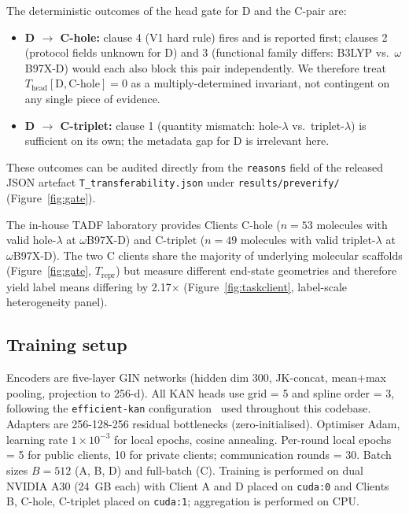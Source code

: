 \documentclass[11pt,a4paper]{article}
\begin{document}
\begin{sloppypar}
\noindent The deterministic outcomes of the head gate for D and the C-pair are:
\begin{itemize}
  \item \textbf{D $\to$ C-hole:} clause 4 (V1 hard rule) fires and is reported first; clauses 2 (protocol fields unknown for D) and 3 (functional family differs: B3LYP vs.\ $\omega$B97X-D) would each also block this pair independently. We therefore treat $T_{\mathrm{head}}[\mathrm{D}, \mathrm{C\text{-}hole}] = 0$ as a multiply-determined invariant, not contingent on any single piece of evidence.
  \item \textbf{D $\to$ C-triplet:} clause 1 (quantity mismatch: hole-$\lambda$ vs.\ triplet-$\lambda$) is sufficient on its own; the metadata gap for D is irrelevant here.
\end{itemize}
These outcomes can be audited directly from the \texttt{reasons} field of the released JSON artefact \texttt{T\_transferability.json} under \texttt{results/preverify/} (Figure~\ref{fig:gate}).
\end{sloppypar}

The in-house TADF laboratory provides Clients C-hole ($n = 53$ molecules with valid hole-$\lambda$ at $\omega$B97X-D) and C-triplet ($n = 49$ molecules with valid triplet-$\lambda$ at $\omega$B97X-D). The two C clients share the majority of underlying molecular scaffolds (Figure~\ref{fig:gate}, $T_{\mathrm{repr}}$) but measure different end-state geometries and therefore yield label means differing by 2.17$\times$ (Figure~\ref{fig:taskclient}, label-scale heterogeneity panel).

\subsection{Training setup}

Encoders are five-layer GIN networks (hidden dim 300, JK-concat, mean+max pooling, projection to 256-d). All KAN heads use grid = 5 and spline order = 3, following the \texttt{efficient-kan} configuration~\citep{EfficientKAN2024} used throughout this codebase. Adapters are 256-128-256 residual bottlenecks (zero-initialised). Optimiser Adam, learning rate $1\times 10^{-3}$ for local epochs, cosine annealing. Per-round local epochs = 5 for public clients, 10 for private clients; communication rounds = 30. Batch sizes $B = 512$ (A, B, D) and full-batch (C). Training is performed on dual NVIDIA A30 (24~GB each) with Client A and D placed on \texttt{cuda:0} and Clients B, C-hole, C-triplet placed on \texttt{cuda:1}; aggregation is performed on CPU.
\end{document}
